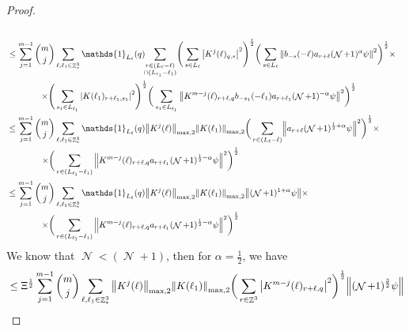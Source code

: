 \documentclass[sn-mathphys, Numbered ,a4paper]{sn-jnl}%
\DeclareMathOperator{\Z}{\mathbb{Z}}
\DeclareMathOperator{\NN}{\mathcal{N}}
\newcommand{\half}{\frac{1}{2}}
\newcommand{\normmaxii}[1]{\norm{#1}_{\mathrm{max,2}}}
\theoremstyle{plain}
\theoremstyle{definition}
\theoremstyle{remark}
\theoremstyle{plain}
\theoremstyle{definition}
\theoremstyle{remark}
\begin{document}
{\begin{proof}
\begin{alignat}{2}
\begin{aligned}[t]
 	\end{aligned} \nonumber\\
 	&\leq \sum\limits_{j=1}^{m-1} \begin{aligned}[t] {{m}\choose j} &\sum\limits_{\ell, \ell_1\in \Z^3_*} \mathds{1}_{L_{\ell}}(q)\!\! 
 		\sum\limits_{\substack{r\in (L_{\ell}-\ell) \\ \cap (L_{\ell_1}-\ell_1)}}\! \Bigg( \sum\limits_{s \in L_\ell} \abs{K^{j}(\ell)_{q,s}}^2\Bigg)^\half \bigg( \sum\limits_{s \in L_\ell}\norm{  b_{-s}(-\ell) a_{r+\ell} (\NN+1)^{\alpha}\psi}^2\bigg)^\half \times\nonumber\\ \times \Bigg( &\sum\limits_{s_1 \in L_{\ell_1}} \abs{ K(\ell_1)_{r+\ell_1,s_1} }^2\Bigg)^\half \bigg(\sum\limits_{s_1 \in L_{\ell_1}}\norm{ K^{m-j}(\ell)_{r+\ell,q}  b_{-s_1}(-\ell_1)  a_{r+\ell_1} (\NN+1)^{-\alpha}\psi }^2\bigg)^\half
 	\end{aligned} \nonumber\\   
 	&\leq \sum\limits_{j=1}^{m-1} \begin{aligned}[t]{{m}\choose j} &\sum\limits_{\ell,\ell_1 \in \Z^3_*} \mathds{1}_{L_{\ell}}(q) \normmaxii{K^j(\ell)} \normmaxii{K(\ell_1)} 
 		\bigg( \sum\limits_{r\in (L_{\ell}-\ell)}\!  \norm{ a_{r+\ell} (\NN+1)^{\half+\alpha}\psi}^2\bigg)^\half \times \nonumber\\ \times 
 		\bigg( &\sum\limits_{r\in (L_{\ell_1}-\ell_1) }\norm{ K^{m-j}(\ell)_{r+\ell,q}   a_{r+\ell_1} (\NN+1)^{\half-\alpha}\psi }^2\bigg)^\half
 	\end{aligned} \nonumber\\
 	&\leq \sum\limits_{j=1}^{m-1} \begin{aligned}[t]{{m}\choose j} &\sum\limits_{\ell,\ell_1 \in \Z^3_*} \mathds{1}_{L_{\ell}}(q) \normmaxii{K^j(\ell)} \normmaxii{K(\ell_1)}  
 		\norm{ (\NN+1)^{1+\alpha}\psi} \times \nonumber\\ \times 
 		\bigg( &\sum\limits_{r\in  (L_{\ell_1}-\ell_1) }  \norm{ K^{m-j}(\ell)_{r+\ell,q} a_{r+\ell_1} (\NN+1)^{\half-\alpha}\psi }^2\bigg)^\half \end{aligned} \nonumber\\
 \end{alignat}
 We know that $\NN<(\NN+1)$, then for $\alpha = \half$, we have
 \begin{alignat}{2}
 	&\leq \Xi^\half\sum\limits_{j=1}^{m-1} {{m}\choose j} \sum\limits_{\ell, \ell_1\in \Z^3_*} \normmaxii{K^j(\ell)} \normmaxii{K(\ell_1)} \bigg(\sum\limits_{r\in \Z^3}  \abs{ K^{m-j}(\ell)_{r+\ell,q} }^2\bigg)^\half  \norm{(\NN+1)^\frac{3}{2} \psi}  \nonumber\\

\end{alignat}
\end{proof}}
\end{document}
